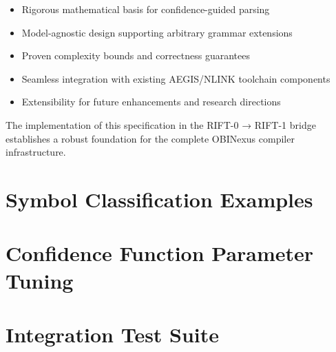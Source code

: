 \documentclass[11pt,a4paper]{article}
\theoremstyle{definition}
\theoremstyle{remark}
\begin{document}
\begin{itemize}
\item Rigorous mathematical basis for confidence-guided parsing
\item Model-agnostic design supporting arbitrary grammar extensions  
\item Proven complexity bounds and correctness guarantees
\item Seamless integration with existing AEGIS/NLINK toolchain components
\item Extensibility for future enhancements and research directions
\end{itemize}

The implementation of this specification in the RIFT-0 → RIFT-1 bridge establishes a robust foundation for the complete OBINexus compiler infrastructure.




\appendix

\section{Symbol Classification Examples}
\label{app:symbol-examples}

\section{Confidence Function Parameter Tuning}
\label{app:parameter-tuning}

\section{Integration Test Suite}
\label{app:test-suite}
\end{document}
